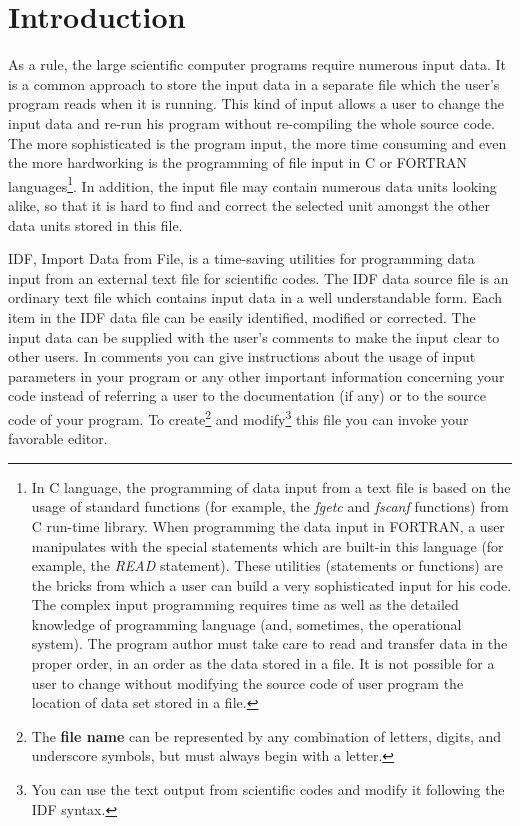\newpage
\section{Introduction}

As a rule, the large scientific computer programs require
numerous input data. It is a common approach to store
the input data in a separate file which the user's program
reads when it is running. This kind of input allows
a user to change the input data and re-run his program
without re-compiling the whole source code.
The more sophisticated is the program input,
the more time consuming and even the more hardworking is
the programming of file input in  C or FORTRAN languages\footnote{
In C language, the programming of data input from a text file
is based on the usage of standard functions  
(for example, the {\it fgetc} and {\it fscanf} functions)
from  C run-time library.
When programming the data input in FORTRAN, a user manipulates
with the special statements which are built-in this language
(for example, the {\it READ} statement). 
These utilities (statements or functions)
are the bricks from which a user can build a very
sophisticated input for his code.
The complex input programming requires time as well as
the detailed knowledge of programming language
(and, sometimes, the operational system).
The program author must take care to read and transfer
data in the proper order, 
in an order as the data stored in a file.
It is not possible for a user
to change without modifying the source code of user program
the location of data set stored in a file.
}.
In addition, the input file may contain numerous data units looking alike, 
so that it is hard to find and correct the selected unit amongst
the other data units stored in this file. 

IDF, Import Data from File, is a time-saving utilities
for programming data input from an external text file
for scientific codes.
The IDF data source file is an ordinary text file
which contains input data in a well understandable form.
Each item in the IDF data file
can be easily identified, modified or corrected.
The input data can be supplied with the user's comments
to make the input clear to other users.
In comments you can give instructions
about the usage of input parameters in your program
or any other important information concerning your code
instead of referring  a user to the documentation (if any)
or to the source code of your program.
To create\footnote{
The {\bf file name} can be represented by any combination
of letters, digits, and underscore symbols,
but must always begin with a letter.
}
and modify\footnote{
You can use the text output from  scientific codes and
modify it following the IDF syntax.
}
this file you can invoke your favorable editor.

